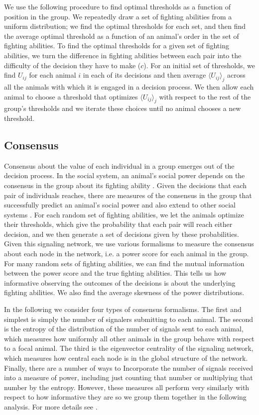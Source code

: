 \documentclass{article}
\begin{document}
 We use the following procedure to find optimal thresholds as a function of position in the group.  We repeatedly draw a set of fighting abilities from a uniform distribution; we find the optimal thresholds for each set, and then find the average optimal threshold as a function of an animal's order in the set of fighting abilities. To find the optimal thresholds for a given set of fighting abilities, we turn the difference in fighting abilities between each pair into the difficulty of the decision they have to make ($c$).  For an initial set of thresholds, we find $U_{ij}$ for each animal $i$ in each of its decisions and then average $\langle U_{ij}\rangle_j$ across all the animals with which it is engaged in a decision process.  We then allow each animal to choose a threshold that optimizes $\langle U_{ij}\rangle_j$ with respect to the rest of the group's thresholds and we iterate these choices until no animal chooses a new threshold.  

\subsection{Consensus }
Consensus about the value of each individual in a group emerges out of the decision process.  In the social system, an animal's social power depends on the consensus in the group about its fighting ability \cite{Brush:2013fk,Flack:2004oq,Flack:2006uq}.  Given the decisions that each pair of individuals reaches, there are measures of the consensus in the group that successfully predict an animal's social power and also extend to other social systems \cite{Brush:2013fk}.  For each random set of fighting abilities, we let the animals optimize their thresholds, which give the probability that each pair will reach either decision, and we then generate a set of decisions given by these probabilities.  Given this signaling network, we use various formalisms to measure the consensus about each node in the network, i.e. a power score for each animal in the group.  For many random sets of fighting abilities, we can find the mutual information between the power score and the true fighting abilities. This tells us how informative observing the outcomes of the decisions is about the underlying fighting abilities.  We also find the average skewness of the power distributions.

In the following we consider four types of consensus formalisms.  The first and simplest is simply the number of signalers submitting to each animal.  The second is the entropy of the distribution of the number of signals sent to each animal, which measures how uniformly all other animals in the group behave with respect to a focal animal.  The third is the eigenvector centrality of the signaling network, which measures how central each node is in the global structure of the network.  Finally, there are a number of ways to Incorporate the number of signals received into a measure of power, including just counting that number or multiplying that number by the entropy.  However, these measures all perform very similarly with respect to how informative they are so we group them together in the following analysis.  For more details see \cite{Brush:2013fk}.  
\end{document}
